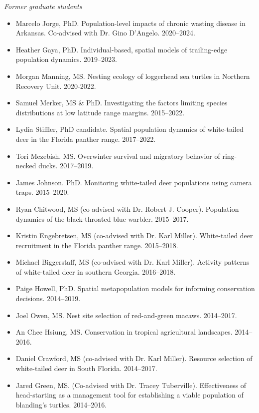 \documentclass[12pt]{article}
\begin{document}
{\it Former graduate students}
\begin{itemize}
  \item Marcelo Jorge, PhD. Population-level impacts of
    chronic wasting disease in Arkansas. Co-advised with Dr. Gino
    D'Angelo. 2020--2024.
  \item Heather Gaya, PhD. Individual-based, spatial models
    of trailing-edge population dynamics. 2019--2023. 
  \item Morgan Manning, MS. Nesting ecology of loggerhead
    sea turtles in Northern Recovery Unit. 2020-2022. 
  \item Samuel Merker, MS \& PhD. Investigating the factors
    limiting species distributions at low latitude range
    margins. 2015--2022. 
  \item Lydia Stiffler, PhD candidate. Spatial population dynamics of
    white-tailed deer in the Florida panther range. 2017--2022.
  \item Tori Mezebish. MS. Overwinter survival and migratory
    behavior of ring-necked ducks. 2017--2019.
   \item James Johnson. PhD. Monitoring white-tailed deer
     populations using camera traps. 2015--2020. 
  \item Ryan Chitwood, MS (co-advised with Dr. Robert
    J. Cooper). Population dynamics of the black-throated blue
    warbler. 2015--2017. 
  \item Kristin Engebretsen, MS (co-advised with Dr. Karl
    Miller). White-tailed deer recruitment in the Florida panther
    range. 2015--2018. 
  \item Michael Biggerstaff, MS (co-advised with Dr. Karl
    Miller). Activity patterns of white-tailed deer in southern
    Georgia. 2016--2018. 
  \item Paige Howell, PhD. Spatial metapopulation models for 
    informing conservation decisions. 2014--2019. 
  \item Joel Owen, MS. Nest site selection of red-and-green
    macaws. 2014--2017. 
  \item An Chee Hsiung, MS. Conservation in tropical agricultural
    landscapes. 2014--2016. 
  \item Daniel Crawford, MS (co-advised with Dr. Karl
    Miller). Resource selection of white-tailed deer in South
    Florida. 2014--2017. 
  \item Jared Green, MS. (Co-advised with Dr. Tracey
    Tuberville). Effectiveness of head-starting as a management tool
    for establishing a viable population of blanding's
    turtles. 2014--2016. 
\end{itemize}
\end{document}
